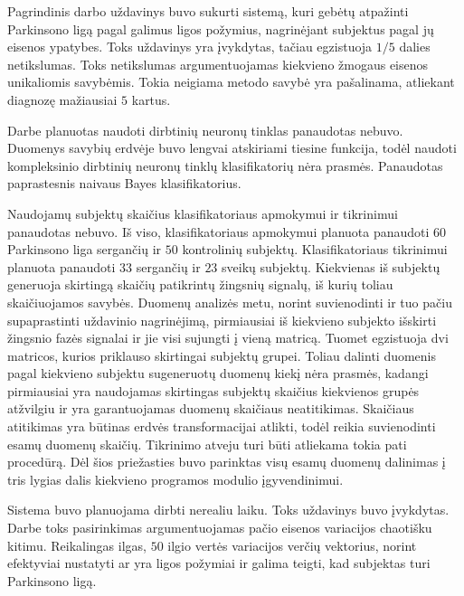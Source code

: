 \documentclass[]{vgtuef}
\begin{document}

Pagrindinis darbo uždavinys buvo sukurti sistemą, kuri gebėtų atpažinti Parkinsono ligą pagal galimus ligos požymius, nagrinėjant subjektus pagal jų eisenos ypatybes. Toks uždavinys yra įvykdytas, tačiau egzistuoja $1/5$ dalies netikslumas. Toks netikslumas argumentuojamas kiekvieno žmogaus eisenos unikaliomis savybėmis. Tokia neigiama metodo savybė yra pašalinama, atliekant diagnozę mažiausiai $5$ kartus.

Darbe planuotas naudoti dirbtinių neuronų tinklas panaudotas nebuvo. Duomenys savybių erdvėje buvo lengvai atskiriami tiesine funkcija, todėl naudoti kompleksinio dirbtinių neuronų tinklų klasifikatorių nėra prasmės. Panaudotas paprastesnis naivaus Bayes klasifikatorius.

Naudojamų subjektų skaičius klasifikatoriaus apmokymui ir tikrinimui panaudotas nebuvo. Iš viso, klasifikatoriaus apmokymui planuota panaudoti $60$ Parkinsono liga sergančių ir $50$ kontrolinių subjektų. Klasifikatoriaus tikrinimui planuota panaudoti $33$ sergančių ir $23$ sveikų subjektų. Kiekvienas iš subjektų generuoja skirtingą skaičių patikrintų žingsnių signalų, iš kurių toliau skaičiuojamos savybės. Duomenų analizės metu, norint suvienodinti ir tuo pačiu supaprastinti uždavinio nagrinėjimą, pirmiausiai iš kiekvieno subjekto išskirti žingsnio fazės signalai ir jie visi sujungti į vieną matricą. Tuomet egzistuoja dvi matricos, kurios priklauso skirtingai subjektų grupei. Toliau dalinti duomenis pagal kiekvieno subjektu sugeneruotų duomenų kiekį nėra prasmės, kadangi pirmiausiai yra naudojamas skirtingas subjektų skaičius kiekvienos grupės atžvilgiu ir yra garantuojamas duomenų skaičiaus neatitikimas. Skaičiaus atitikimas yra būtinas erdvės transformacijai atlikti, todėl reikia suvienodinti esamų duomenų skaičių. Tikrinimo atveju turi būti atliekama tokia pati procedūrą. Dėl šios priežasties buvo parinktas visų esamų duomenų dalinimas į tris lygias dalis kiekvieno programos modulio įgyvendinimui.

Sistema buvo planuojama dirbti nerealiu laiku. Toks uždavinys buvo įvykdytas. Darbe toks pasirinkimas argumentuojamas pačio eisenos variacijos chaotišku kitimu. Reikalingas ilgas, $50$ ilgio vertės variacijos verčių vektorius, norint efektyviai nustatyti ar yra ligos požymiai ir galima teigti, kad subjektas turi Parkinsono ligą.

\end{document}
